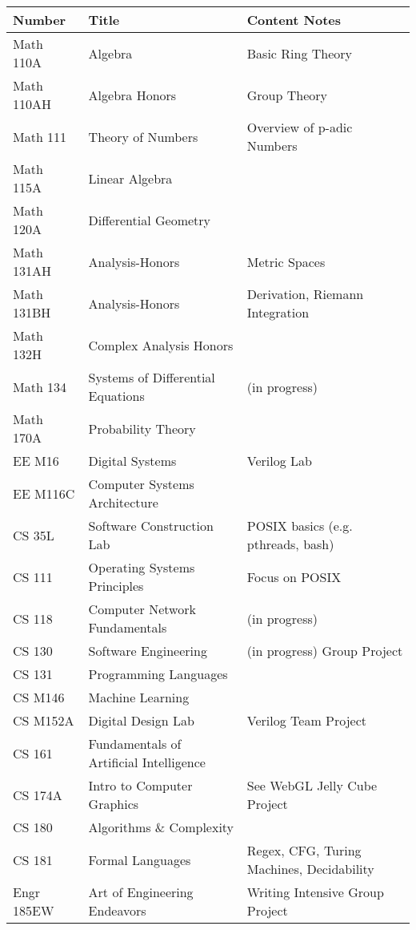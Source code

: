 \documentclass[11pt]{article}
\begin{document}
\begin{tabular}{l|l|l}
Number & Title & Content Notes \\
\hline
Math 110A & Algebra & Basic Ring Theory \\
Math 110AH & Algebra Honors & Group Theory \\
Math 111 & Theory of Numbers & Overview of p-adic Numbers \\
Math 115A & Linear Algebra & \\
Math 120A & Differential Geometry & \\
Math 131AH & Analysis-Honors & Metric Spaces \\
Math 131BH & Analysis-Honors & Derivation, Riemann Integration \\
Math 132H & Complex Analysis Honors & \\
Math 134 & Systems of Differential Equations& (in progress) \\
Math 170A & Probability Theory & \\
EE M16 & Digital Systems & Verilog Lab \\
EE M116C & Computer Systems Architecture & \\
CS 35L & Software Construction Lab & POSIX basics (e.g. pthreads, bash) \\
CS 111 & Operating Systems Principles & Focus on POSIX \\
CS 118 & Computer Network Fundamentals & (in progress) \\
CS 130 & Software Engineering & (in progress) Group Project \\
CS 131 & Programming Languages & \\
CS M146 & Machine Learning & \\
CS M152A & Digital Design Lab & Verilog Team Project \\
CS 161 & Fundamentals of Artificial Intelligence & \\
CS 174A & Intro to Computer Graphics & See WebGL Jelly Cube Project \\
CS 180 & Algorithms \& Complexity & \\
CS 181 & Formal Languages\footnotemark & Regex, CFG, Turing Machines, Decidability \\
Engr 185EW & Art of Engineering Endeavors & Writing Intensive Group Project
\end{tabular}
\end{document}
